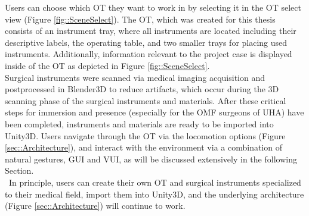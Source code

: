 Users can choose which OT they want to work in by selecting it in the OT select view (Figure \ref{fig::SceneSelect}).
The OT, which was created for this thesis consists of an instrument tray, where all instruments are located including their descriptive labels, the operating table, and two smaller trays 
for placing used instruments.
Additionally, information relevant to the project case is displayed inside of the OT as depicted in Figure \ref{fig::SceneSelect}.
\\ Surgical instruments were scanned via medical imaging acquisition and postprocessed in Blender3D to reduce artifacts, which occur during the 3D scanning phase of the surgical instruments and materials.
After these critical steps for immersion and presence (especially for the OMF surgeons of UHA) have been completed, instruments and materials are ready to be imported into Unity3D.
Users navigate through the OT via the locomotion options (Figure \ref{sec::Architecture}), and interact with the environment via a combination of natural gestures, GUI and VUI, as will be discussed 
extensively in the following Section.
\\ In principle, users can create their own OT and surgical instruments specialized to their medical field, import them into Unity3D, and the underlying architecture (Figure \ref{sec::Architecture}) 
will continue to work.